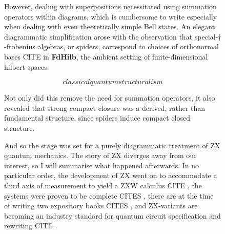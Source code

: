 \begin{figure}[h!]
\centering
{}
\caption{However, dealing with superpositions necessitated using summation operators within diagrams, which is cumbersome to write especially when dealing with even theoretically simple Bell states. An elegant diagrammatic simplification arose with the observation that special-$\dagger$-frobenius algebras, or spiders, correspond to choices of orthonormal bases \bR CITE \e in \textbf{FdHilb}, the ambient setting of finite-dimensional hilbert spaces.}
\end{figure}

\begin{figure}[h!]
\centering
\[classicalquantumstructuralism\]
\caption{Not only did this remove the need for summation operators, it also revealed that strong compact closure was a derived, rather than fundamental structure, since spiders induce compact closed structure.}
\end{figure}

\begin{figure}[h!]
\centering
{}
\caption{And so the stage was set for a purely diagrammatic treatment of ZX quantum mechanics. The story of ZX diverges away from our interest, so I will summarise what happened afterwards. In no particular order, the development of ZX went on to accommodate a third axis of measurement to yield a ZXW calculus \bR CITE \e, the systems were proven to be complete \bR CITES \e, there are at the time of writing two expository books \bR CITES \e, and ZX-variants are becoming an industry standard for quantum circuit specification and rewriting \bR CITE \e.}
\end{figure}
\clearpage

